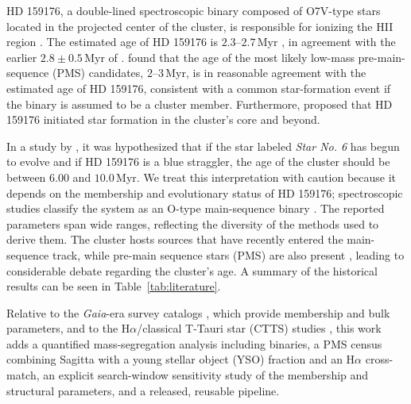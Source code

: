 \documentclass{aa}
\begin{document}
HD 159176, a double-lined spectroscopic binary composed of O7V-type stars located in the projected center of the cluster, is responsible for ionizing the HII region \citep{2016ApJ...832..211P}. The estimated age of HD 159176 is $2.3$--$2.7\,\mathrm{Myr}$ \citep{2010AA...511A..25R}, in agreement with the earlier $2.8\pm0.5\,\mathrm{Myr}$ of \citet{1978MNRAS.182..607F}. \citet{2010AA...511A..25R} found that the age of the most likely low-mass pre-main-sequence (PMS) candidates, $2$--$3\,\mathrm{Myr}$, is in reasonable agreement with the estimated age of HD 159176, consistent with a common star-formation event if the binary is assumed to be a cluster member. Furthermore, \citet{1978MNRAS.182..607F} proposed that HD 159176 initiated star formation in the cluster's core and beyond.  %

In a study by \citet{2018AA...610A..30A}, it was hypothesized that if the star labeled \textit{Star No. 6} has begun to evolve and if HD 159176 is a blue straggler, the age of the cluster should be between $6.00$ and $10.0\,\mathrm{Myr}$. We treat this interpretation with caution because it depends on the membership and evolutionary status of HD 159176; spectroscopic studies classify the system as an O-type main-sequence binary \citep{1993Obs...113..204S,2007A&A...474..193L,2016ApJ...832..211P}. The reported parameters span wide ranges, reflecting the diversity of the methods used to derive them. The cluster hosts sources that have recently entered the main-sequence track, while pre-main sequence stars (PMS) are also present \citep{2019MNRAS.484.5102K}, leading to considerable debate regarding the cluster's age. A summary of the historical results can be seen in Table~\ref{tab:literature}.

Relative to the \textit{Gaia}-era survey catalogs \citep{2020AA...640A...1C,2022ApJS..262....7H,2024arXiv240305143H}, which provide membership and bulk parameters, and to the H$\alpha$/classical T-Tauri star (CTTS) studies \citep{2010AA...511A..25R,2019MNRAS.484.5102K}, this work adds a quantified mass-segregation analysis including binaries, a PMS census combining Sagitta with a young stellar object (YSO) fraction and an H$\alpha$ cross-match, an explicit search-window sensitivity study of the membership and structural parameters, and a released, reusable pipeline.
\end{document}
